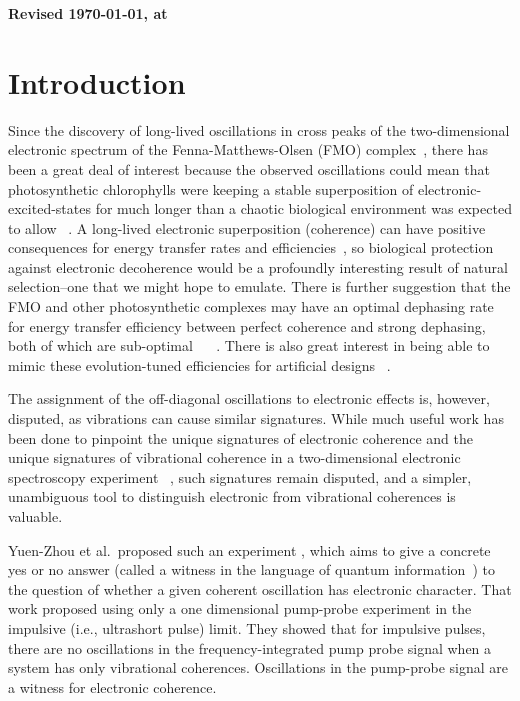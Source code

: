 \textbf{Revised \today , at \currenttime}

\providecommand{\comment}[1]{\textbf{[#1]}}

\section{Introduction}


Since the discovery of long-lived oscillations in cross peaks of the two-dimensional electronic spectrum of the Fenna-Matthews-Olsen (FMO) complex~\cite{FMO1}, there has been a great deal of interest because the observed oscillations could mean that photosynthetic chlorophylls were keeping a stable superposition of electronic-excited-states for much longer than a chaotic biological environment was expected to allow ~\cite{FMO2,Panitchayangkoon2011,Lambert2012}.
%
A long-lived electronic superposition (coherence) can have positive consequences for energy transfer rates and efficiencies~\cite{FMO1}, so biological protection against electronic decoherence would be a profoundly interesting result of natural selection--one that we might hope to emulate. There is further suggestion that the FMO and other photosynthetic complexes may have an optimal dephasing rate for energy transfer efficiency between perfect coherence and strong dephasing, both of which are sub-optimal ~\cite{energyTransfer} ~\cite{Panitchayangkoon2011,Fidler2013,Collini2010}.  There is also great interest in being able to mimic these evolution-tuned efficiencies for artificial designs ~\cite{Creatore2013}.

The assignment of the off-diagonal oscillations to electronic effects is, however, disputed, as vibrations can cause similar signatures.  While much useful work has been done to pinpoint the  unique signatures of electronic coherence and the unique signatures of vibrational coherence in a two-dimensional electronic spectroscopy experiment ~\cite{FMO2,mech2,mech3,mech1,mech4,Halpin2014,Chenu2013}, such signatures remain disputed, and a simpler, unambiguous tool to distinguish electronic from vibrational coherences is valuable.

Yuen-Zhou et al.\ proposed such an experiment \cite{witness}, which aims to give a concrete yes or no answer (called a witness in the language of quantum information~\cite{Chuang2005}) to the question of whether a given coherent oscillation has electronic character.  That work proposed using only a one dimensional pump-probe experiment in the impulsive (i.e., ultrashort pulse) limit.  They showed that for impulsive pulses, there are no oscillations in the frequency-integrated pump probe signal when a system has only vibrational coherences. Oscillations in the pump-probe signal  are a witness for electronic coherence.

